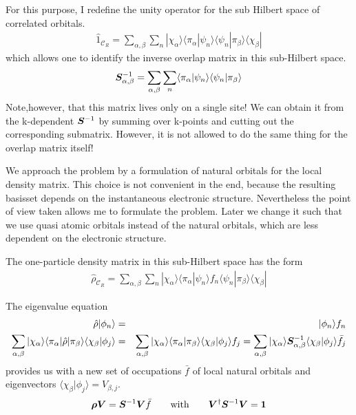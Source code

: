 \documentclass[11pt,a4paper]{report}
\begin{document}
For this purpose, I redefine the unity operator for the sub Hilbert
space of correlated orbitals.
\begin{eqnarray}
\hat{1}_{\mathcal{C}_R}
=\sum_{\alpha,\beta}\sum_n
|\chi_\alpha\rangle
\langle\pi_\alpha|\psi_n\rangle\langle\psi_n|\pi_\beta\rangle
\langle\chi_\beta|
\end{eqnarray}
which allows one to identify the inverse overlap matrix in this
sub-Hilbert space.
\begin{eqnarray}
\bm{S}^{-1}_{\alpha,\beta}
=\sum_{\alpha,\beta}\sum_n
\langle\pi_\alpha|\psi_n\rangle\langle\psi_n|\pi_\beta\rangle
\end{eqnarray}
Note,however, that this matrix lives only on a single site! We can
obtain it from the k-dependent $\bm{S}^{-1}$ by summing over k-points
and cutting out the corresponding submatrix. However, it is not
allowed to do the same thing for the overlap matrix itself!

We approach the problem by a formulation of natural orbitals for the
local density matrix. This choice is not convenient in the end,
because the resulting basisset depends on the instantaneous electronic
structure. Nevertheless the point of view taken allows me to formulate
the problem. Later we change it such that we use quasi atomic orbitals
instead of the natural orbitals, which are less dependent on the
electronic structure.

The one-particle density matrix in this sub-Hilbert space has the form
\begin{eqnarray}
\hat{\rho}_{\mathcal{C}_R}
=\sum_{\alpha,\beta}\sum_n
|\chi_\alpha\rangle
\langle\pi_\alpha|\psi_n\rangle f_n \langle\psi_n|\pi_\beta\rangle
\langle\chi_\beta|
\end{eqnarray}

The eigenvalue equation
\begin{eqnarray}
\hat{\rho}|\phi_n\rangle&=&|\phi_n\rangle f_n
\nonumber\\
\sum_{\alpha,\beta}|\chi_\alpha\rangle
\langle\pi_\alpha|\hat{\rho}|\pi_\beta\rangle\langle\chi_\beta|\phi_j\rangle
&=&\sum_{\alpha,\beta}|\chi_\alpha\rangle\langle\pi_\alpha|\pi_\beta\rangle
\langle\chi_\beta|\phi_j\rangle f_j
=\sum_{\alpha,\beta}|\chi_\alpha\rangle
\bm{S}^{-1}_{\alpha,\beta}\langle\chi_\beta|\phi_j\rangle \bar{f}_j
\end{eqnarray}
provides us with a new set of occupations $\bar{f}$ of local natural
orbitals and eigenvectors
$\langle\chi_\beta|\phi_j\rangle=V_{\beta,j}$.
\begin{eqnarray}
\bm{\rho}\bm{V}=\bm{S}^{-1}\bm{V}\bar{f}
\qquad\text{with}\qquad
\bm{V}^\dagger\bm{S}^{-1}\bm{V}=\bm{1}
\label{eq:eigenvaluprobforlocalnatorb}
\end{eqnarray}
\end{document}
